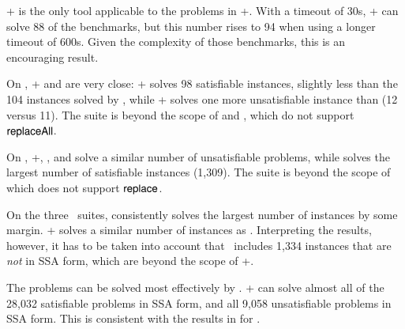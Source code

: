 {\ostrich}+ is the only tool applicable to the problems in
{\transducerbench}+. With a timeout of 30s, \ostrich+ can solve 88 of
the benchmarks, but this number rises to 94 when using a longer
timeout of 600s. Given the complexity of those benchmarks, this is an
encouraging result.

On {\slogbenchra}, {\ostrich}+ and {\cvc} are very close: {\ostrich}+ solves 98 satisfiable instances, slightly less than the 104 instances solved by {\cvc}, while {\ostrich}+ solves one more unsatisfiable instance than {\cvc} (12 versus 11). The suite is beyond the scope of {\zthree} and {\zthreetrau}, which do not support $\mathsf{replaceAll}$.

On {\slogbenchr}, {\ostrich}+, {\cvc}, and {\zthree} solve a similar
number of unsatisfiable problems, while {\cvc} solves the largest
number of satisfiable instances (1,309). The  suite %
is beyond the scope of {\zthreetrau} which does not support
$\mathsf{replace}$.

On the three \pyexbench\ suites, {\zthreetrau} consistently solves the
largest number of instances by some margin. \ostrich+ solves a similar
number of instances as \zthree. Interpreting the results, however, it
has to be taken into account that \pyexbench\  includes 1,334  instances
that are \emph{not} in SSA form, which are beyond the scope of
\ostrich+.

\iffalse
For {\pyextdbench}, each of the four solvers is able to solve more than 95\% of the benchmark instances and their performances are close, with {\zthreetrau} the best, followed by {\cvc}, then {\zthree}, and finally {\ostrich}+.  

For {\pyexztbench}, {\zthreetrau} is the best, solving almost all instances. %
{\cvc} and {\zthree} are ranked in the second and third place. The performance of {\ostrich}+ on this benchmark suite is not very impressive, only solving around 80\% instances.

For {\pyexzzbench}, %
{\zthreetrau} again is the best, which is followed closely by {\cvc}. %
The performance of {\ostrich}+ and {\zthree} are level, but are 10\% worse than  {\zthreetrau} and {\cvc}. %
\fi

The {\kaluzabench} problems can be solved most effectively by {\cvc}.
\ostrich+ can solve almost all of the 28,032 satisfiable
problems in SSA form, and all 9,058 unsatisfiable problems in SSA
form. This is consistent with the results in  \cite{CHL+19} for
{\ostrich}.

